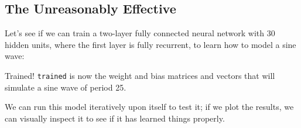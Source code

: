 \documentclass[]{article}
\newenvironment{Shaded}{}{}
\newcommand{\CommentTok}[1]{\textcolor[rgb]{0.38,0.63,0.69}{\textit{#1}}}
\newcommand{\DataTypeTok}[1]{\textcolor[rgb]{0.56,0.13,0.00}{#1}}
\newcommand{\DecValTok}[1]{\textcolor[rgb]{0.25,0.63,0.44}{#1}}
\newcommand{\FunctionTok}[1]{\textcolor[rgb]{0.02,0.16,0.49}{#1}}
\newcommand{\KeywordTok}[1]{\textcolor[rgb]{0.00,0.44,0.13}{\textbf{#1}}}
\newcommand{\NormalTok}[1]{#1}
\newcommand{\OperatorTok}[1]{\textcolor[rgb]{0.40,0.40,0.40}{#1}}
\newcommand{\OtherTok}[1]{\textcolor[rgb]{0.00,0.44,0.13}{#1}}
\begin{document}
\hypertarget{the-unreasonably-effective}{%
\subsection{The Unreasonably Effective}\label{the-unreasonably-effective}}

Let's see if we can train a two-layer fully connected neural network with 30
hidden units, where the first layer is fully recurrent, to learn how to model a
sine wave:

\begin{Shaded}
\end{Shaded}

Trained! \texttt{trained} is now the weight and bias matrices and vectors that
will simulate a sine wave of period 25.

We can run this model iteratively upon itself to test it; if we plot the
results, we can visually inspect it to see if it has learned things properly.
\end{document}
